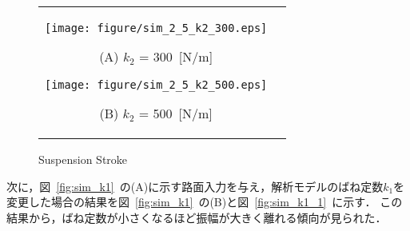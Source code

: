\documentclass[a4paper,12pt]{article_vdlab_sotsuron}
\begin{document}
\vspace{15mm}
\begin{figure}[h]
    \begin{tabular}{cc}
      \begin{minipage}{0.45\hsize}
	\centering
	  \texttt{[image: figure/sim\_2\_5\_k2\_300.eps]}
	  \begin{center}
	  \vspace{2mm}
	  \ (A) $k_2$ = 300~[N/m]\
	  \end{center}
	\end{minipage}
       \begin{minipage}{0.5\hsize}
	\centering
	  \texttt{[image: figure/sim\_2\_5\_k2\_500.eps]}
	  \begin{center}
	  \vspace{2mm}
	  \ (B) $k_2$ = 500~[N/m]\
	  \end{center}
      \end{minipage}
    \end{tabular}
    \vspace{2mm}
    \caption{Suspension Stroke}
    \label{fig:sim_k2_1}
\end{figure}

\newpage
次に，図~\ref{fig:sim_k1}~の(A)に示す路面入力を与え，解析モデルのばね定数$k_1$を変更した場合の結果を図~\ref{fig:sim_k1}~の(B)と図~\ref{fig:sim_k1_1}~に示す．
この結果から，ばね定数が小さくなるほど振幅が大きく離れる傾向が見られた．
\end{document}
